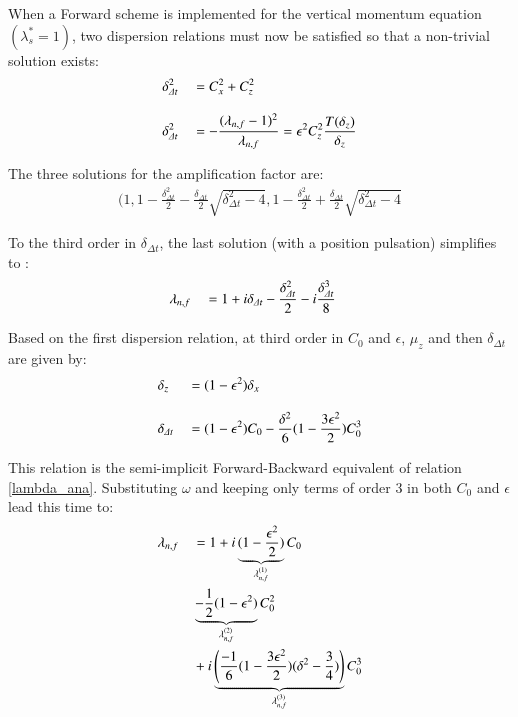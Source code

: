 \documentclass[a4paper,11pt]{article}
\begin{document}
When a Forward scheme is implemented for the vertical momentum equation $(\lambda_s^*=1)$, 
two dispersion relations must now be satisfied so that a non-trivial solution exists:
\begin{equation}
   \begin{split}
    \displaystyle
    & \delta_{\Delta t}^2 && = C_x^2 + C_z^2  \\[3mm]
    \displaystyle
    & \delta_{\Delta t}^2 && = -\frac{(\lambda_{n,f}-1)^2}{\lambda_{n,f}}
      =\epsilon^2 C_z^2 \frac{T(\delta_z)}{\delta_z}
   \end{split}
\end{equation}


The three solutions for the amplification factor are:
\begin{equation}
   \begin{split}
    \displaystyle
    (1,1-\frac{\delta_{\Delta t}^2}{2}-\frac{\delta_{\Delta t}}{2}\sqrt{\delta_{\Delta t}^2-4}
      ,1-\frac{\delta_{\Delta t}^2}{2}+\frac{\delta_{\Delta t}}{2}\sqrt{\delta_{\Delta t}^2-4}
   \end{split}
\end{equation}

To the third order in $\delta_{\Delta t}$, the last solution (with a position pulsation) simplifies to :
\begin{equation}
   \begin{split}
    \displaystyle
    & \lambda_{n,f} &&=1+i \delta_{\Delta t} - \frac{\delta_{\Delta t}^2}{2} -i \frac{\delta_{\Delta t}^3}{8}
   \end{split}
\end{equation}


Based on the first dispersion relation, at third order in $C_0$ and $\epsilon $, $\mu_z$  and then $\delta_{\Delta t}$ 
are given by:
\begin{equation}
   \begin{split}
    \displaystyle
    & \delta_{z} &&=(1-\epsilon^2)\delta_x\\[3mm]
    \displaystyle
    & \delta_{\Delta t} &&=(1-\epsilon^2)C_0-\frac{\delta^2}{6}(1-\frac{3\epsilon^2}{2})C_0^3
   \end{split}
\end{equation}
 
This relation is the semi-implicit Forward-Backward equivalent of relation \eqref{lambda_ana}. Substituting $\omega$ and keeping only terms of order 3 in both $C_0$ and $\epsilon$ lead this time to:
\begin{equation}
   \label{lambdanf}
   \begin{split}
    \displaystyle
     &\lambda_{n,f} &&= 1 +i\underbrace{(1-\frac{\epsilon^2}{2})}_{\lambda_{n,f}^{(1)}} C_0\\
     & &&\underbrace{-\frac{1}{2}(1-\epsilon^2)}_{\lambda_{n,f}^{(2)}} C_0^2\\
     & &&+i\underbrace{\left(\frac{-1}{6}(1-\frac{3\epsilon^2}{2})
     (\delta^2-\frac{3}{4})\right)}_{\lambda_{n,f}^{(3)}} C_0^3
   \end{split}
\end{equation}
\end{document}
